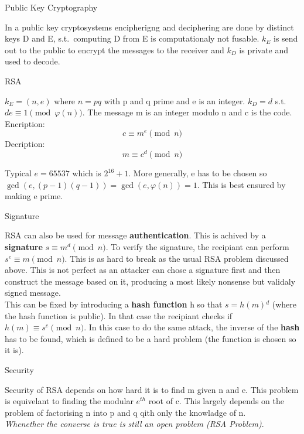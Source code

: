 \documentclass[12pt, letterpaper]{article}
\begin{document}
\begin{section}{Public Key Cryptography}

  In a public key cryptosystems encipherigng and deciphering are done by
  distinct keys D and E, s.t.\ computing D from E is computationaly not fusable.
  \(k_{E}\) is send out to the public to encrypt the messages to the receiver
  and \(k_{D}\) is private and used to decode.

  \begin{subsection}{RSA}

    \(k_{E} = (n, e)\) where \(n = pq\) with p and q prime and e is an
    integer. \(k_{D} = d\) s.t.\ \(de \equiv 1 \pmod{\varphi(n)}\). The
    message m is an integer modulo n and c is the code. \\
    Encription: \[c \equiv m^{e} \pmod{n}\]
    Decription: \[m \equiv c^{d} \pmod{n}\]

    Typical \(e = 65537\) which is \(2^{16} + 1\). More generally, e has to be
    chosen so \(\gcd(e, (p - 1)(q - 1)) = \gcd(e, \varphi(n)) = 1\). This is
    best ensured by making e prime.

    \begin{subsubsection}{Signature}

      RSA can also be used for message \textbf{authentication}. This is achived
      by a \textbf{signature} \(s \equiv m^{d} \pmod{n}\). To verify the
      signature, the recipiant can perform \(s^{e} \equiv m \pmod{n}\). This is as
      hard to break as the usual RSA problem discussed above. This is not perfect
      as an attacker can chose a signature first and then construct the message
      based on it, producing a most likely nonsense but validaly signed message. \\
      This can be fixed by introducing a \textbf{hash function} h so that
      \(s = h(m){}^{d}\) (where the hash function is public). In that case the
      recipiant checks if \(h(m) \equiv s^{e} \pmod{n}\). In this case to do the
      same attack, the inverse of the \textbf{hash} has to be found, which is
      defined to be a hard problem (the function is chosen so it is).

    \end{subsubsection}

    \begin{subsubsection}{Security}

      Security of RSA depends on how hard it is to find m given n and e. This
      problem is equivelant to finding the modular \(e^{th}\) root of c. This
      largely depends on the problem of factorising n into p and q qith only
      the knowladge of n. \\
      \textit{Whenether the converse is true is still an open problem (RSA
        Problem)}.


\end{subsubsection}
\end{subsection}
\end{section}
\end{document}
